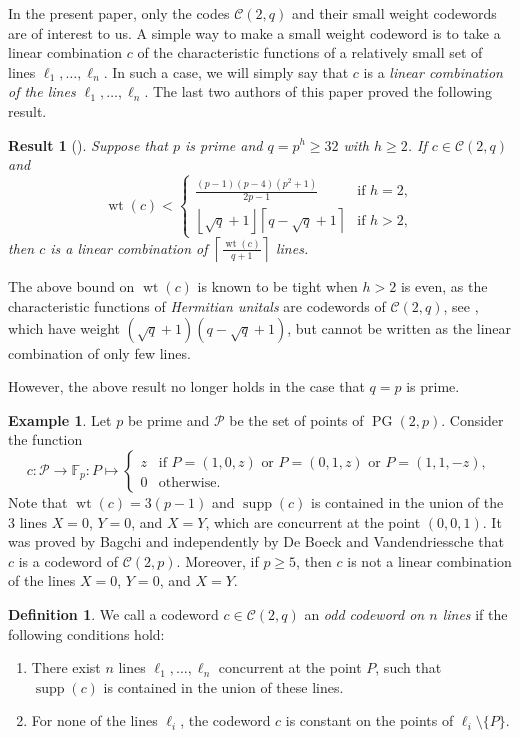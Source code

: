 \documentclass[12pt, a4paper]{article}
\newtheorem{res}[thm]{Result}
\theoremstyle{definition}
\newtheorem{df}[thm]{Definition}
\newtheorem{ex}[thm]{Example}
\newcommand{\FF}{\mathbb F}
\newcommand{\floor}[1]{\left \lfloor #1 \right \rfloor}
\newcommand{\ceil}[1]{\left \lceil #1 \right \rceil}
\newcommand{\mc}{\mathcal C}
\renewcommand{\mp}{\mathcal P}
\DeclareMathOperator{\supp}{supp}
\DeclareMathOperator{\wt}{wt}
\DeclareMathOperator{\PG}{PG}
\newcommand{\pg}{\PG}
\begin{document}
In the present paper, only the codes $\mc(2,q)$ and their small weight codewords are of interest to us.
A simple way to make a small weight codeword is to take a linear combination $c$ of the characteristic functions of a relatively small set of lines $\ell_1, \dots, \ell_n$.
In such a case, we will simply say that $c$ is a \emph{linear combination of the lines $\ell_1, \dots, \ell_n$}.
The last two authors of this paper proved the following result.

\begin{res}[{\cite[Theorem 4.3]{Szonyi:Weiner:14}}]
 \label{Res:SzWNonPrime}
 Suppose that $p$ is prime and $q = p^h \geq 32$ with $h \geq 2$.
 If $c \in \mc(2,q)$ and
 \[
  \wt(c) < \begin{cases}
   \frac{(p-1)(p-4)(p^2+1)}{2p-1} & \text{if } h = 2, \\
   \floor{\sqrt q + 1}\ceil{q - \sqrt q + 1} & \text{if } h > 2,
  \end{cases}
 \]
 then $c$ is a linear combination of $\ceil{\frac{\wt(c)}{q+1}}$ lines.
\end{res}

The above bound on $\wt(c)$ is known to be tight when $h > 2$ is even, as the characteristic functions of \emph{Hermitian unitals} are codewords of $\mc(2,q)$, see \cite{blokhuisbrouwerwilbrink}, which have weight $(\sqrt q + 1)(q - \sqrt q + 1)$, but cannot be written as the linear combination of only few lines.

However, the above result no longer holds in the case that $q=p$ is prime.

\begin{ex}
 \label{Ex:OddOn3}
 Let $p$ be prime and $\mp$ be the set of points of $\pg(2,p)$.
Consider the function
\[
 c: \mp \to \FF_p: P \mapsto \begin{cases}
  z & \text{if } P = (1,0,z) \text{ or } P = (0,1,z) \text{ or } P = (1,1,-z), \\
  0 & \text{otherwise}.
 \end{cases}
\]
Note that $\wt(c) = 3(p-1)$ and $\supp(c)$ is contained in the union of the 3 lines $X=0$, $Y=0$, and $X=Y$, which are concurrent at the point $(0,0,1)$.
It was proved by Bagchi \cite[Theorem 5.2]{Bagchi} and independently by De Boeck and Vandendriessche \cite[Example 10.3.4]{DeBoeckPhd} that $c$ is a codeword of $\mc(2,p)$.
Moreover, if $p \geq 5$, then $c$ is not a linear combination of the lines $X=0$, $Y=0$, and $X=Y$.
\end{ex}

\begin{df}
 \label{Df:OddCodeword}
 We call a codeword $c \in \mc(2,q)$ an \emph{odd codeword on $n$ lines} if the following conditions hold:
 \begin{enumerate}
  \item There exist $n$ lines $\ell_1, \dots, \ell_n$ concurrent at the point $P$, such that $\supp(c)$ is contained in the union of these lines.
  \item For none of the lines $\ell_i$, the codeword $c$ is constant on the points of $\ell_i \setminus \{P\}$.
 \end{enumerate}
\end{df}
\end{document}
